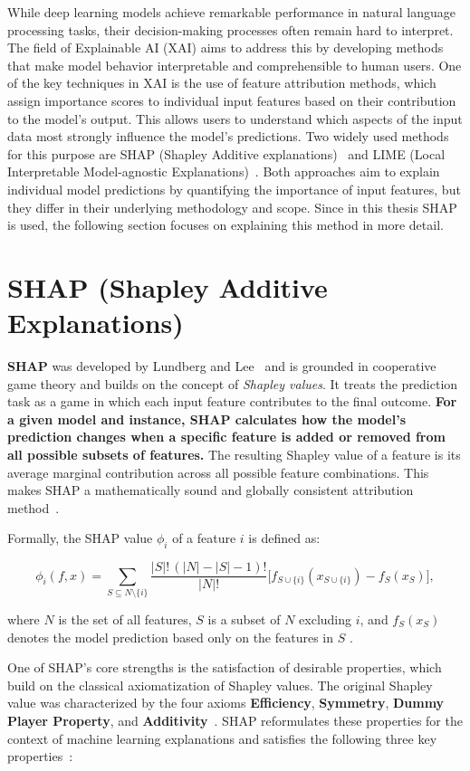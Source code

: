 While deep learning models achieve remarkable performance in natural language processing tasks, their decision-making processes often remain hard to interpret. The field of Explainable AI (XAI) aims to address this by developing methods that make model behavior interpretable and comprehensible to human users.  One of the key techniques in XAI is the use of feature attribution methods, which assign importance scores to individual input features based on their contribution to the model's output. This allows users to understand which aspects of the input data most strongly influence the model's predictions. Two widely used methods for this purpose are SHAP (Shapley Additive explanations)~\cite{lundberg2017shap} and LIME (Local Interpretable Model-agnostic Explanations)~\cite{ribeiro2016lime}. Both approaches aim to explain individual model predictions by quantifying the importance of input features, but they differ in their underlying methodology and scope. Since in this thesis SHAP is used, the following section focuses on explaining this method in more detail. 


\section{SHAP (Shapley Additive Explanations)}
\textbf{SHAP} was developed by Lundberg and Lee~\cite{lundberg2017shap} and is grounded in cooperative game theory and builds on the concept of \emph{Shapley values}. It treats the prediction task as a game in which each input feature contributes to the final outcome. \textbf{For a given model and instance, SHAP calculates how the model's prediction changes when a specific feature is added or removed from all possible subsets of features.} The resulting Shapley value of a feature is its average marginal contribution across all possible feature combinations. This makes SHAP a mathematically sound and globally consistent attribution method~\cite{lundberg2017shap}.

Formally, the SHAP value $\phi_i$ of a feature $i$ is defined as:

\[
\phi_i(f, x) = 
\sum_{S \subseteq N \setminus \{i\}} 
\frac{|S|!\,(|N|-|S|-1)!}{|N|!} 
\Big[ f_{S \cup \{i\}}(x_{S \cup \{i\}}) - f_S(x_S) \Big],
\]

where $N$ is the set of all features, $S$ is a subset of $N$ excluding $i$, and 
$f_S(x_S)$ denotes the model prediction based only on the features in $S$ 
\cite{lundberg2017shap}.

One of SHAP's core strengths is the satisfaction of desirable properties, which build on the classical axiomatization of Shapley values. The original Shapley value was characterized by the four axioms \textbf{Efficiency}, \textbf{Symmetry}, \textbf{Dummy Player Property}, and \textbf{Additivity}~\cite{shapley1953value}. SHAP reformulates these properties for the context of machine learning explanations and satisfies the following three key properties~\cite{lundberg2017shap}:

